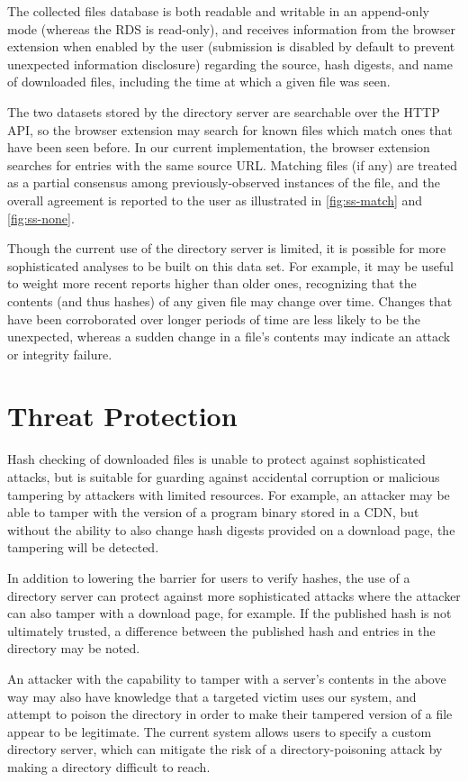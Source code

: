 \documentclass[letterpaper,twocolumn,10pt]{article}
\begin{document}
The collected files database is both readable and writable in an append-only mode
(whereas the RDS is read-only), and receives information from the browser extension
when enabled by the user (submission is disabled by default to prevent unexpected
information disclosure) regarding the source, hash digests, and name of downloaded
files, including the time at which a given file was seen.

The two datasets stored by the directory server are searchable over the HTTP
API, so the browser extension may search for known files which match ones
that have been seen before. In our current implementation, the browser extension
searches for entries with the same source URL. Matching files (if any) are
treated as a partial consensus among previously-observed instances of the file,
and the overall agreement is reported to the user as illustrated in \autoref{fig:ss-match}
and \autoref{fig:ss-none}.

Though the current use of the directory server is limited, it is possible for more
sophisticated analyses to be built on this data set. For example, it may be
useful to weight more recent reports higher than older ones, recognizing
that the contents (and thus hashes) of any given file may change over time.
Changes that have been corroborated over longer periods of time are less
likely to be the unexpected, whereas a sudden change in a file's contents may indicate
an attack or integrity failure.

\section{Threat Protection}

Hash checking of downloaded files is unable to protect against sophisticated attacks, but is
suitable for guarding against accidental corruption or malicious tampering by attackers with
limited resources. For example, an attacker may be able to tamper with the version of a
program binary stored in a CDN, but without the ability to also change hash digests provided
on a download page, the tampering will be detected.

In addition to lowering the barrier for users to verify hashes, the use of a directory
server can protect against more sophisticated attacks where the attacker can also
tamper with a download page, for example. If the published hash is not ultimately trusted,
a difference between the published hash and entries in the directory may be noted.

An attacker with the capability to tamper with a server's contents in the above way may
also have knowledge that a targeted victim uses our system, and attempt to poison the
directory in order to make their tampered version of a file appear to be legitimate. The
current system allows users to specify a custom directory server, which can mitigate the
risk of a directory-poisoning attack by making a directory difficult to reach.
\end{document}
